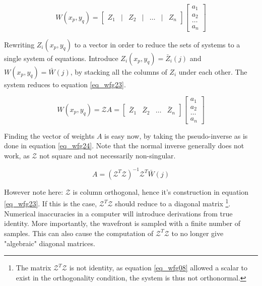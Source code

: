 \documentclass{article}
\begin{document}
\begin{equation}
W(x_p,y_q) = 
\begin{bmatrix}
Z_1 & | & Z_2 & | & \dots & | & Z_n
\end{bmatrix}
\begin{bmatrix}
a_1 \\
a_2 \\
\dots \\
a_n
\end{bmatrix}
\label{eq_wfg22}
\end{equation}

Rewriting $Z_i(x_p,y_q)$ to a vector in order to reduce the sets of systems to a single system of equations. Introduce $Z_i(x_p,y_q) = \bar{Z}_i(j)$ and $W(x_p,y_q) = \bar{W}(j)$, by stacking all the columns of $Z_i$ under each other. The system reduces to equation \ref{eq_wfg23}.

\begin{equation}
W(x_p,y_q) = \mathcal{Z}A = 
\begin{bmatrix}
\bar{Z}_1 & \bar{Z}_2 & \dots & \bar{Z}_n
\end{bmatrix}
\begin{bmatrix}
a_1 \\
a_2 \\
\dots \\
a_n
\end{bmatrix}
\label{eq_wfg23}
\end{equation}

Finding the vector of weights $A$ is easy now, by taking the pseudo-inverse as is done in equation \ref{eq_wfg24}. Note that the normal inverse generally does not work, as $\mathcal{Z}$ not square and not necessarily non-singular.

\begin{equation}
A = \left(\mathcal{Z}^T \mathcal{Z} \right)^{-1} \mathcal{Z}^T \bar{W}(j)
\label{eq_wfg24}
\end{equation}

However note here: $\mathcal{Z}$ is column orthogonal, hence it's construction in equation \ref{eq_wfg23}. If this is the case, $\mathcal{Z}^T \mathcal{Z}$ should reduce to a diagonal matrix \footnote{The matrix $\mathcal{Z}^T \mathcal{Z}$ is not identity, as equation \ref{eq_wfg08} allowed a scalar to exist in the orthogonality condition, the system is thus not orthonormal.}. 
Numerical inaccuracies in a computer will introduce derivations from true identity. More importantly, the wavefront is sampled with a finite number of samples. This can also cause the computation of $\mathcal{Z}^T \mathcal{Z}$ to no longer give "algebraic" diagonal matrices.
\end{document}
